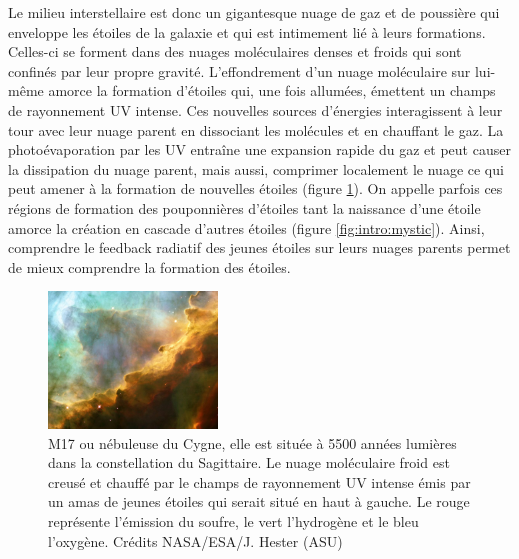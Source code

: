 \documentclass[11pt,a4paper]{article}
\begin{document}
\begin{spacing}{0.98}
Le milieu interstellaire est donc un gigantesque nuage de gaz et de poussière qui enveloppe les étoiles de la galaxie et qui est intimement lié à leurs formations. Celles-ci se forment dans des nuages moléculaires denses et froids qui sont confinés par leur propre gravité. L'effondrement d'un nuage moléculaire sur lui-même amorce la formation d'étoiles qui, une fois allumées, émettent un champs de rayonnement UV intense. Ces nouvelles sources d'énergies interagissent à leur tour avec leur nuage parent en dissociant les molécules et en chauffant le gaz. La photoévaporation par les UV entraîne une expansion rapide du gaz et peut causer la dissipation du nuage parent, mais aussi, comprimer localement le nuage ce qui peut amener à la formation de nouvelles étoiles (figure \ref{fig:m17}). On appelle parfois ces régions de formation des \og pouponnières d'étoiles \fg{} tant la naissance d'une étoile amorce la création en cascade d'autres étoiles (figure \ref{fig:intro:mystic}). Ainsi, comprendre le feedback radiatif des jeunes étoiles sur leurs nuages parents permet de mieux comprendre la formation des étoiles. \newline 

\begin{figure}[!p]
    \centering
    \includegraphics[trim = {0 0 0 0},clip, width=0.4\textwidth]{figure/omega.pdf}
    \caption{M17 ou nébuleuse du Cygne, elle est située à 5500 années lumières dans la constellation du Sagittaire. Le nuage moléculaire froid est creusé et chauffé par le champs de rayonnement UV intense émis par un amas de jeunes étoiles qui serait situé en haut à gauche. Le rouge représente l'émission du soufre, le vert l'hydrogène et le bleu l'oxygène.
    Crédits NASA/ESA/J. Hester (ASU)}
    \label{fig:m17}
\end{figure}{}


\end{spacing}
\end{document}
